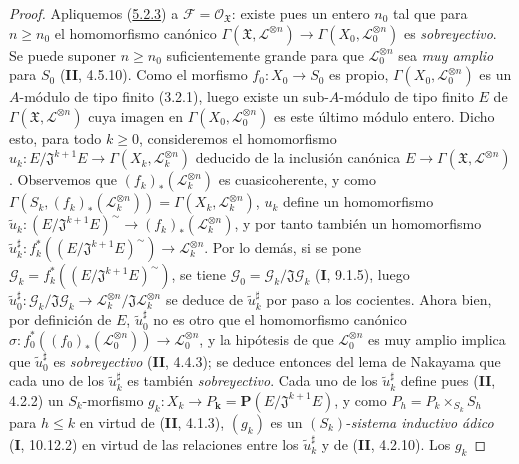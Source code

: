 \begin{proof}
Apliquemos (\hyperref[III.5.2.3-fr]{5.2.3}) a
$\mathcal F=\mathcal O_{\mathfrak X}$: existe pues un entero $n_0$ tal que
para $n\geq n_0$ el homomorfismo canónico
$\Gamma(\mathfrak X,\mathcal L^{\otimes n})\to
\Gamma(X_0,\mathcal L_0^{\otimes n})$ es \emph{sobreyectivo}. Se puede suponer
$n\geq n_0$ suficientemente grande para que $\mathcal L_0^{\otimes n}$ sea \emph{muy
amplio} para $S_0$ (\textbf{II}, 4.5.10). Como el morfismo $f_0:X_0\to S_0$ es propio,
$\Gamma(X_0,\mathcal L_0^{\otimes n})$ es un $A$-módulo de tipo finito (3.2.1),
luego existe un sub-$A$-módulo de tipo finito $E$ de
$\Gamma(\mathfrak X,\mathcal L^{\otimes n})$ cuya imagen en
$\Gamma(X_0,\mathcal L_0^{\otimes n})$ es este último módulo entero.
Dicho esto, para todo $k\geq0$, consideremos el homomorfismo
$u_k:E/\mathfrak J^{k+1}E\longrightarrow
\Gamma(X_k,\mathcal L_k^{\otimes n})$
deducido de la inclusión canónica
$E\to\Gamma(\mathfrak X,\mathcal L^{\otimes n})$. Observemos que
$(f_k)_*(\mathcal L_k^{\otimes n})$ es cuasicoherente, y como
$\Gamma(S_k,(f_k)_*(\mathcal L_k^{\otimes n}))
=\Gamma(X_k,\mathcal L_k^{\otimes n})$, $u_k$ define un homomorfismo
$\widetilde u_k:(E/\mathfrak J^{k+1}E)^\sim
\longrightarrow(f_k)_*(\mathcal L_k^{\otimes n})$,
y por tanto también un homomorfismo
$\widetilde u_k^\sharp:
f_k^*((E/\mathfrak J^{k+1}E)^\sim)\longrightarrow
\mathcal L_k^{\otimes n}$.
Por lo demás, si se pone
$\mathcal G_k=f_k^*((E/\mathfrak J^{k+1}E)^\sim)$, se tiene
$\mathcal G_0=\mathcal G_k/\mathfrak J\mathcal G_k$ (\textbf{I}, 9.1.5), luego
$\widetilde u_0^\sharp:\mathcal G_k/\mathfrak J\mathcal G_k
\to\mathcal L_k^{\otimes n}/\mathfrak J\mathcal L_k^{\otimes n}$ se deduce
de $\widetilde u_k^\sharp$ por paso a los cocientes. Ahora bien, por definición de
$E$, $\widetilde u_0^\sharp$ no es otro que el homomorfismo canónico
$\sigma:f_0^*((f_0)_*(\mathcal L_0^{\otimes n}))\longrightarrow
\mathcal L_0^{\otimes n}$,
y la hipótesis de que $\mathcal L_0^{\otimes n}$ es muy amplio implica que
$\widetilde u_0^\sharp$ es \emph{sobreyectivo} (\textbf{II}, 4.4.3); se deduce entonces del lema
de Nakayama que cada uno de los $\widetilde u_k^\sharp$ es también \emph{sobreyectivo}.
Cada uno de los $\widetilde u_k^\sharp$ define pues (\textbf{II}, 4.2.2) un
$S_k$-morfismo
$g_k:X_k\longrightarrow P_{\boldsymbol{k}}=\mathbf P(E/\mathfrak J^{k+1}E)$,
y como $P_h=P_k\times_{S_k}S_h$ para $h\leq k$ en virtud de (\textbf{II}, 4.1.3),
$(g_k)$ es un $(S_k)$-\emph{sistema inductivo ádico} (\textbf{I}, 10.12.2) en virtud de las
relaciones entre los $\widetilde u_k^\sharp$ y de (\textbf{II}, 4.2.10). Los $g_k$

\end{proof}
